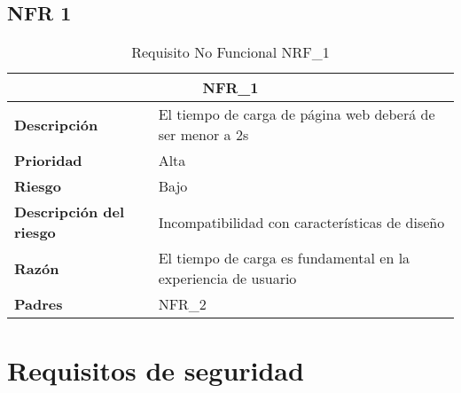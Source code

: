 \documentclass{scrreprt}
\begin{document}
\subsection{NFR 1}
\begin{table}[H]
    \label{tab:my-table}
    \begin{tabular}{|p{5cm}|p{11cm}|}
    \hline
    \multicolumn{2}{|c|}{\textbf{NFR_1}} \\
    \hline
    \textbf{Descripción  }                      &  El tiempo de carga de página web deberá de ser menor a 2s                                 \\ \hline
    \textbf{Prioridad}                          & Alta                                                                                             \\ \hline
    \textbf{Riesgo}                          & Bajo                                                                                               \\ \hline
    \textbf{Descripción del riesgo}                    & Incompatibilidad con características de diseño                                 \\ \hline
    \textbf{Razón}                   & El tiempo de carga es fundamental en la experiencia de usuario                                                                                \\ \hline
    \textbf{Padres}                               &  NFR_2\\  \hline
    \end{tabular}%
    
    \caption{Requisito No Funcional NRF_1}
\end{table}

\section{Requisitos de seguridad}
\end{document}
